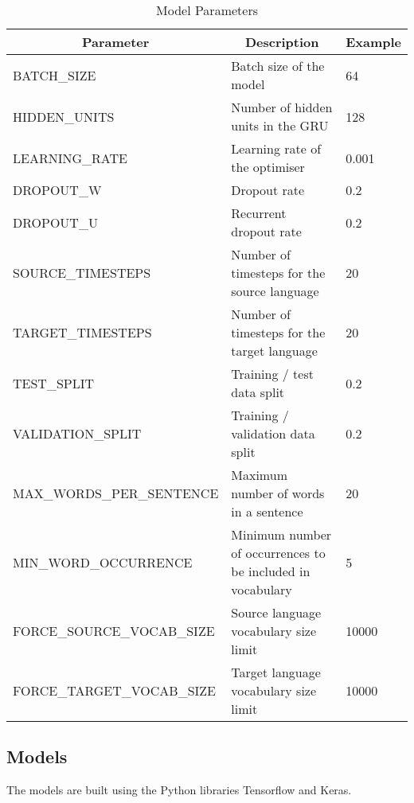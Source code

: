 \begin{table}[!ht]
\centering
\small
\begin{tabular}{|l|p{6.6cm}|l|}
\hline
\multicolumn{1}{|c|}{\textbf{Parameter}} & \multicolumn{1}{c|}{\textbf{Description}}                                       & \textbf{Example} \\ \hline
BATCH\_SIZE                & Batch size of the model                            & 64    \\ \hline
HIDDEN\_UNITS              & Number of hidden units in the GRU                  & 128   \\ \hline
LEARNING\_RATE             & Learning rate of the optimiser                     & 0.001 \\ \hline
DROPOUT\_W                 & Dropout rate                                       & 0.2   \\ \hline
DROPOUT\_U                 & Recurrent dropout rate                             & 0.2   \\ \hline
SOURCE\_TIMESTEPS          & Number of timesteps for the source language        & 20    \\ \hline
TARGET\_TIMESTEPS          & Number of timesteps for the target language        & 20    \\ \hline
TEST\_SPLIT                & Training / test data split                         & 0.2   \\ \hline
VALIDATION\_SPLIT          & Training / validation data split                   & 0.2   \\ \hline
MAX\_WORDS\_PER\_SENTENCE  & Maximum number of words in a sentence              & 20    \\ \hline
MIN\_WORD\_OCCURRENCE      & Minimum number of occurrences to be included in vocabulary & 5 \\ \hline
FORCE\_SOURCE\_VOCAB\_SIZE & Source language vocabulary size limit              & 10000 \\ \hline
FORCE\_TARGET\_VOCAB\_SIZE & Target language vocabulary size limit              & 10000 \\ \hline
\end{tabular}
\caption{Model Parameters}
\label{tab:model-parameters}
\end{table}

\subsection{Models}

The models are built using the Python libraries Tensorflow and Keras.


